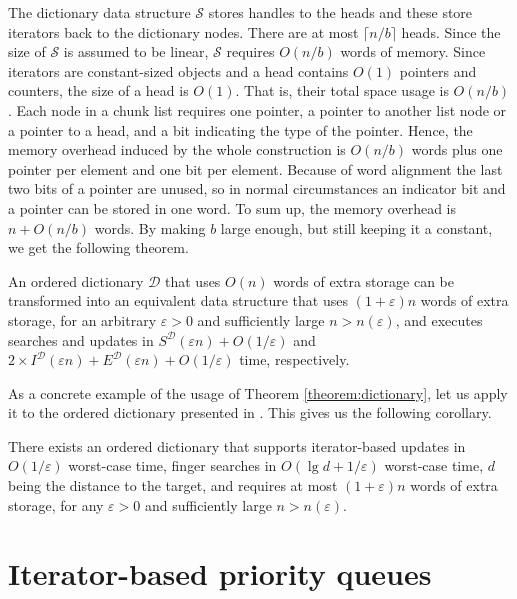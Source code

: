 \documentclass{DIKU-article}
\newcommand{\seclabel}[1]{\label{sec:#1}}
\newcommand{\ceils}[1]{\lceil #1 \rceil}
\begin{document}
The dictionary data structure $\mathcal{S}$ stores handles to the heads
and these store iterators back to the dictionary
nodes. There are at most $\ceils{n/b}$ heads. Since the size of
$\mathcal{S}$ is assumed to be linear, $\mathcal{S}$ requires $O(n/b)$
words of memory. Since iterators are constant-sized objects and a head
contains $O(1)$ pointers and counters, the size of a head is
$O(1)$. That is, their total space usage is $O(n/b)$. Each
node in a chunk list requires one pointer, a pointer to another list
node or a pointer to a head, and a bit indicating the type of the
pointer.   Hence, the memory overhead induced by the whole construction is
$O(n/b)$ words plus one pointer per element and one bit per element.
Because of word alignment the last two bits of a pointer are unused,
so in normal circumstances an indicator bit and a pointer can be
stored in one word. To sum up, the memory overhead is $n + O(n/b)$
words. By making $b$ large enough, but still keeping it a constant, we
get the following theorem.

\begin{theorem}
\label{theorem:dictionary}
An ordered dictionary $\mathcal{D}$ that uses $O(n)$ words of extra
storage can be transformed into an equivalent data structure
 that uses $(1+\varepsilon)n$ words of extra storage,
for an arbitrary $\varepsilon > 0$ and sufficiently large $n >
n(\varepsilon)$, and executes searches and updates in
$S^{\mathcal{D}}(\varepsilon n) + O(1/\varepsilon)$ and $2\times
I^{\mathcal{D}}(\varepsilon n) + E^{\mathcal{D}}(\varepsilon n) +
O(1/\varepsilon)$ time, respectively.
\end{theorem}

As a concrete example of the usage of Theorem
\ref{theorem:dictionary}, let us apply it to the ordered dictionary
presented in \cite{BLMTT03}. This gives us the following corollary.

\begin{corollary}
\label{corollary:dictionary}
There exists an ordered dictionary that supports iterator-based
updates in $O(1/\varepsilon)$ worst-case time, finger searches in
$O(\lg d + 1/\varepsilon)$ worst-case time, $d$ being the distance to
the target, and requires at most $(1 + \varepsilon)n$ words of
extra storage, for any $\varepsilon > 0$ and sufficiently large
$n > n(\varepsilon)$.
\end{corollary}

\section{Iterator-based priority queues}\seclabel{iterator-queues}
\end{document}
